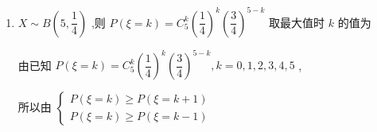 \begin{enumerate}
\begin{enumerate}
\begin{jieda}
            设有 $k$ 个学生选择前往北京或上海研学的概率最大，则 $\left\{  \begin{array}{l} P\left( {X = k}\right)  \geq  P\left( {X = k + 1}\right) \\  P\left( {X = k}\right)  \geq  P\left( {X = k - 1}\right)  \end{array}\right.$，即$\left\{\begin{array}{l}
                 {{C}}_{30}^{k} \cdot  {\left( \dfrac{1}{4}\right) }^{k} \cdot  {\left( \dfrac{3}{4}\right) }^{{30} - k} \geq  {{C}}_{30}^{k + 1} \cdot  {\left( \dfrac{1}{4}\right) }^{k + 1} \cdot  {\left( \dfrac{3}{4}\right) }^{{29} - k}  \\
                 {{C}}_{30}^{k} \cdot  {\left( \dfrac{1}{4}\right) }^{k} \cdot  {\left( \dfrac{3}{4}\right) }^{{30} - k} \geq  {{C}}_{30}^{k - 1} \cdot  {\left( \dfrac{1}{4}\right) }^{k - 1} \cdot  {\left( \dfrac{3}{4}\right) }^{{31} - k} 
            \end{array}\right.$
            
            即 $\left\{  \begin{array}{l} 
            \dfrac{30!}{k!(30-k)!} \times 3 \geq \dfrac{30!}{(k+1)!(29-k)!} \\
            \dfrac{30!}{k!(30-k)!} \geq \dfrac{30!}{(k-1)!(31-k)!} \times 3
            \end{array}\right.$，即 $\left\{  \begin{array}{l} 
            \dfrac{k+1}{(30-k)} \geq \dfrac{1}{3} \\
            \dfrac{(31-k)}{k} \geq 3
            \end{array}\right.$
            
            解得 $\dfrac{27}{4} \leq  k \leq  \dfrac{31}{4}$，又 $k \in  {\mathbf{N}}^{ * }$ ,所以 $k = 7$，所以有 7 个学生选择前往北京或上海研学的概率最大.
        \end{jieda}
        
        \item $X \sim  B\left( {5,\dfrac{1}{4}}\right)$ ,则 $P\left( {\xi  = k}\right)  = {{C}}_{5}^{k}{\left( \dfrac{1}{4}\right) }^{k}{\left( \dfrac{3}{4}\right) }^{5 - k}$ 取最大值时 $k$ 的值为
        \begin{jieda}
            由已知 $P\left( {\xi  = k}\right)  = {{C}}_{5}^{k}{\left( \dfrac{1}{4}\right) }^{k}{\left( \dfrac{3}{4}\right) }^{5 - k},k = 0,1,2,3,4,5$ ,

            所以由 $\left\{  \begin{array}{l} P\left( {\xi  = k}\right)  \geq  P\left( {\xi  = k + 1}\right) \\  P\left( {\xi  = k}\right)  \geq  P\left( {\xi  = k - 1}\right)  \end{array}\right.$
            

\end{jieda}
\end{enumerate}
\end{enumerate}
